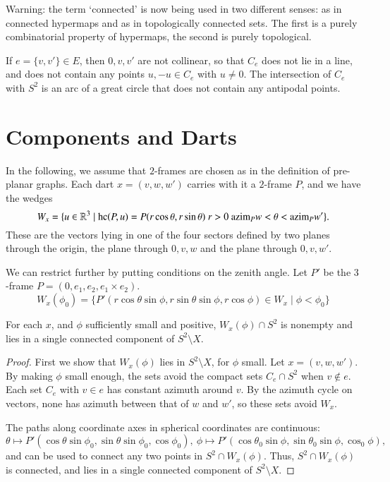 \begin{remark} Warning: the term `connected' is now being used in
two different senses: as in connected hypermaps and as in
topologically connected sets.  The first is a purely combinatorial
property of hypermaps, the second is purely topological.
\end{remark}

If $e=\{v,v'\}\in E$, then $0,v,v'$ are not collinear, so that $C_e$
does not lie in a line, and does not contain any points $u,-u\in
C_e$ with $u\ne 0$.  The intersection of $C_e$ with $S^2$ is an arc
of a great circle that does not contain any antipodal points.



\section{Components and Darts}

In the following, we assume that $2$-frames are chosen as in the
definition of pre-planar graphs.  Each dart $x=(v,w,w')$ carries
with it a $2$-frame $P$, and we have the wedges
    $$W_x = \{u \in\mathbb{R}^3 \mid {\operatorname{hc}}(P, u) = P(r\cos\theta,r\sin\theta)\
       r > 0\ {\operatorname{azim}}_P w < \theta < {\operatorname{azim}}_P w'\}.$$
These are the vectors lying in one of the four sectors defined by
two planes through the origin, the plane through $0,v,w$ and the
plane through $0,v,w'$.

We can restrict further by putting conditions on the zenith angle.
Let $P'$ be the $3$-frame $P= (0,e_1,e_2,e_1\times e_2)$.
    $$W_x(\phi_0) =
    \{P'(r\cos\theta\sin\phi,r\sin\theta\sin\phi,r\cos\phi)\in W_x\mid
    \phi < \phi_0\}$$

\begin{lemma} For each $x$, and $\phi$ sufficiently small and positive,
$W_x(\phi)\cap S^2$ is nonempty and lies in a single connected
component of $S^2\setminus X$.
\end{lemma}

\begin{proof}  First we show that $W_x(\phi)$ lies in $S^2\setminus X$,
for $\phi$ small.  Let $x=(v,w,w')$.  By making $\phi$ small enough,
the sets avoid the compact sets $C_e\cap S^2$ when $v\not\in e$.
Each set $C_e$ with $v\in e$ has constant azimuth around $v$.  By
the azimuth cycle on vectors, none has azimuth between that of $w$
and $w'$, so these sets avoid $W_x$.

The paths along coordinate axes in spherical coordinates are
continuous:
    $$
    \theta \mapsto
    P'(\cos\theta\sin\phi_0,\sin\theta\sin\phi_0,\cos\phi_0),\
    \phi \mapsto
    P'(\cos\theta_0\sin\phi,\sin\theta_0\sin\phi,\cos_0\phi),\
    $$
and can be used to connect any two points in $S^2\cap W_x(\phi)$.
Thus, $S^2\cap W_x(\phi)$ is connected, and lies in a single
connected component of $S^2\setminus X$.
\end{proof}

